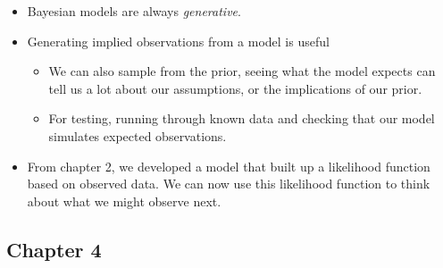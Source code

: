 \documentclass[11pt]{article}
\begin{document}
\begin{itemize}
\tightlist
\item
  Bayesian models are always \emph{generative}.
\item
  Generating implied observations from a model is useful

  \begin{itemize}
  \tightlist
  \item
    We can also sample from the prior, seeing what the model expects can
    tell us a lot about our assumptions, or the implications of our
    prior.
  \item
    For testing, running through known data and checking that our model
    simulates expected observations.
  \end{itemize}
\item
  From chapter 2, we developed a model that built up a likelihood
  function based on observed data. We can now use this likelihood
  function to think about what we might observe next.
\end{itemize}

\hypertarget{chapter-4}{%
\subsection{Chapter 4}\label{chapter-4}}
\end{document}
